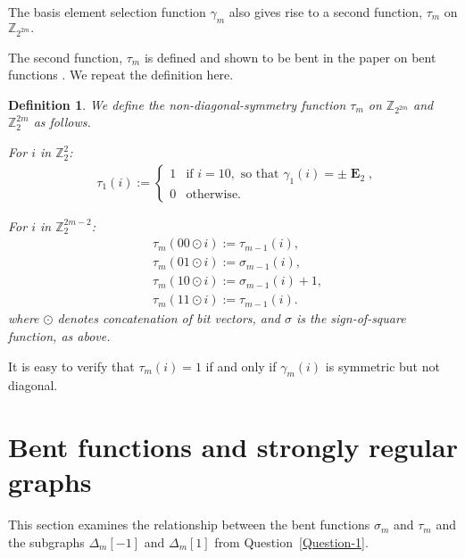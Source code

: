 \documentclass[12pt,a4paper]{article}
\newcommand{\mb}[1]{\mathbb{#1}}
\newcommand{\mf}[1]{\mathbf{#1}}
\newcommand{\oE}{\mf{\operatorname{E}}}
\newcommand{\Z}{\mb{Z}}
\newtheorem*{definition}{Definition}
\begin{document}
The basis element selection function $\gamma_m$ also gives rise to a second function,
$\tau_m$ on $\Z_{2^{2 m}}.$

The second function, $\tau_m$ is defined and shown to be bent in the paper on bent functions \cite{Leo15Bent}.
We repeat the definition here.

\begin{definition}\label{definition-non-diagonal-symmetry-function}
We define the \emph{non-diagonal-symmetry} function $\tau_m$ on $\Z_{2^{2 m}}$ and $\Z_2^{2 m}$
as follows.

For $i$ in $\Z_2^2$:
\begin{align*}
&\tau_1(i) :=
\begin{cases}
1 &\text{if~}i = 10,\text{~so that~}\gamma_1(i) = \pm \oE_2,
\\
0 &\text{otherwise}.
\end{cases}
\end{align*}

For $i$ in $\Z_2^{2 m - 2}$:
\begin{align*}
&\tau_m (00 \odot i) := \tau_{m-1}(i), 
\\
&\tau_m (01 \odot i) := \sigma_{m-1}(i),
\\
&\tau_m (10 \odot i) := \sigma_{m-1}(i) + 1,
\\ 
&\tau_m (11 \odot i) := \tau_{m-1}(i).
\end{align*}
where $\odot$ denotes concatenation of bit vectors, and $\sigma$ is the sign-of-square function, as above.
\end{definition}

It is easy to verify that
$\tau_m(i) = 1$ if and only if $\gamma_m(i)$ is symmetric but not diagonal.

\section{Bent functions and strongly regular graphs}
\label{sec-strongly-regular}
%
This section examines the relationship between the bent functions $\sigma_m$ and $\tau_m$ and
the subgraphs $\varDelta_m[-1]$ and $\varDelta_m[1]$ from Question~\ref{Question-1}.
\end{document}
